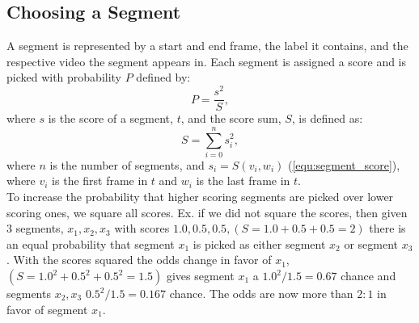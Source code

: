 \subsection{Choosing a Segment}\label{sec:choosing_segment}
%
A segment is represented by a start and end frame, the label it contains, and the respective video the segment appears in. Each segment is assigned a score and is picked with probability $P$ defined by: 
%
\[
P = \frac{s^2}{S},
\]
%
where $s$ is the score of a segment, $t$, and the score sum, $S$, is defined as:
%
\[
S = \sum_{i=0}^{n} s_{i}^2,
\]
%
where $n$ is the number of segments, and $s_i = S(v_i,w_i)$ (\ref{equ:segment_score}), where $v_i$ is the first frame in $t$ and $w_i$ is the last frame in $t$.\\
To increase the probability that higher scoring segments are picked over lower scoring ones, we square all scores. Ex. if we did not square the scores, then given 3 segments, $x_1,x_2,x_3$ with scores $1.0, 0.5, 0.5, (S=1.0+0.5+0.5=2)$ there is an equal probability that segment $x_1$ is picked as either segment $x_2$ or segment $x_3$. With the scores squared the odds change in favor of $x_1$, $(S=1.0^2+0.5^2+0.5^2=1.5)$ gives segment $x_1$ a $1.0^2/1.5=0.67$ chance and segments $x_2,x_3$ $0.5^2/1.5=0.167$ chance. The odds are now more than $2:1$ in favor of segment $x_1$.
%